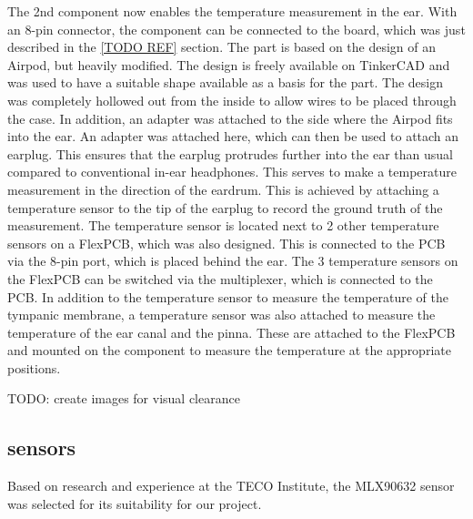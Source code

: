 The 2nd component now enables the temperature measurement in the ear.
With an 8-pin connector, the component can be connected to the board, which was just described in the \ref{TODO REF} section.
The part is based on the design of an Airpod, but heavily modified.
The design is freely available on TinkerCAD and was used to have a suitable shape available as a basis for the part.
The design was completely hollowed out from the inside to allow wires to be placed through the case.
In addition, an adapter was attached to the side where the Airpod fits into the ear. 
An adapter was attached here, which can then be used to attach an earplug.
This ensures that the earplug protrudes further into the ear than usual compared to conventional in-ear headphones.
This serves to make a temperature measurement in the direction of the eardrum. 
This is achieved by attaching a temperature sensor to the tip of the earplug to record the ground truth of the measurement. 
The temperature sensor is located next to 2 other temperature sensors on a FlexPCB, which was also designed.
This is connected to the PCB via the 8-pin port, which is placed behind the ear.
The 3 temperature sensors on the FlexPCB can be switched via the multiplexer, which is connected to the PCB.
In addition to the temperature sensor to measure the temperature of the tympanic membrane, a temperature sensor was also attached to measure the temperature of the ear canal and the pinna. 
These are attached to the FlexPCB and mounted on the component to measure the temperature at the appropriate positions.

TODO: create images for visual clearance

\subsection{sensors}

Based on research and experience at the TECO Institute, the MLX90632 sensor was selected for its suitability for our project.

